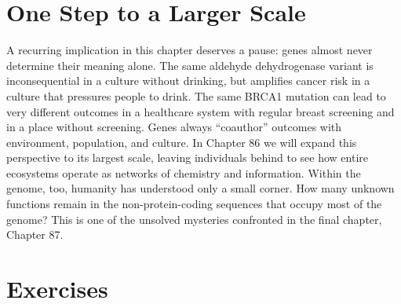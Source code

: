 \section{One Step to a Larger Scale}

A recurring implication in this chapter deserves a pause: genes almost never determine their meaning alone. The same aldehyde dehydrogenase variant is inconsequential in a culture without drinking, but amplifies cancer risk in a culture that pressures people to drink. The same BRCA1 mutation can lead to very different outcomes in a healthcare system with regular breast screening and in a place without screening. Genes always ``coauthor'' outcomes with environment, population, and culture. In Chapter 86 we will expand this perspective to its largest scale, leaving individuals behind to see how entire ecosystems operate as networks of chemistry and information. Within the genome, too, humanity has understood only a small corner. How many unknown functions remain in the non-protein-coding sequences that occupy most of the genome? This is one of the unsolved mysteries confronted in the final chapter, Chapter 87.

\section*{Exercises}

